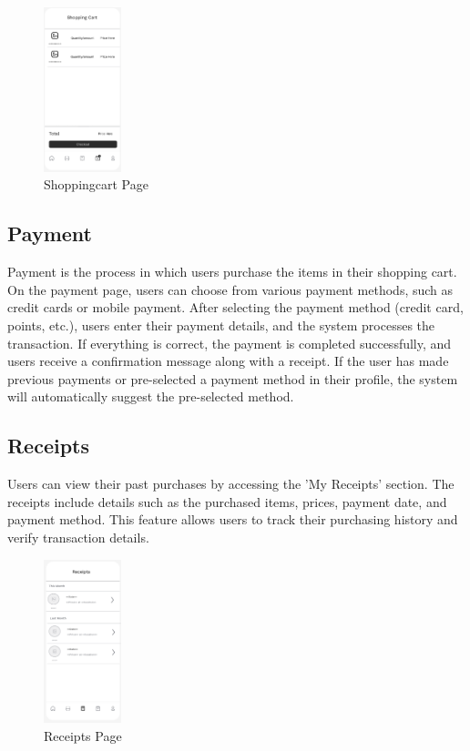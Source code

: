 \documentclass[conference]{IEEEtran}
\begin{document}
\begin{figure}[H]  %
    \centering  %
    \includegraphics[width=0.2\textwidth]{shoppingcart.PNG}  %
    \caption{Shoppingcart Page}  %
\end{figure}

\subsection{Payment}
Payment is the process in which users purchase the items in their shopping cart. On the payment page, users can choose from various payment methods, such as credit cards or mobile payment. After selecting the payment method (credit card, points, etc.), users enter their payment details, and the system processes the transaction. If everything is correct, the payment is completed successfully, and users receive a confirmation message along with a receipt.
If the user has made previous payments or pre-selected a payment method in their profile, the system will automatically suggest the pre-selected method.

\subsection{Receipts}
Users can view their past purchases by accessing the 'My Receipts' section. The receipts include details such as the purchased items, prices, payment date, and payment method. This feature allows users to track their purchasing history and verify transaction details.

\begin{figure}[H]  %
    \centering  %
    \includegraphics[width=0.2\textwidth]{receipts.PNG}  %
    \caption{Receipts Page}  %
\end{figure}
\end{document}
